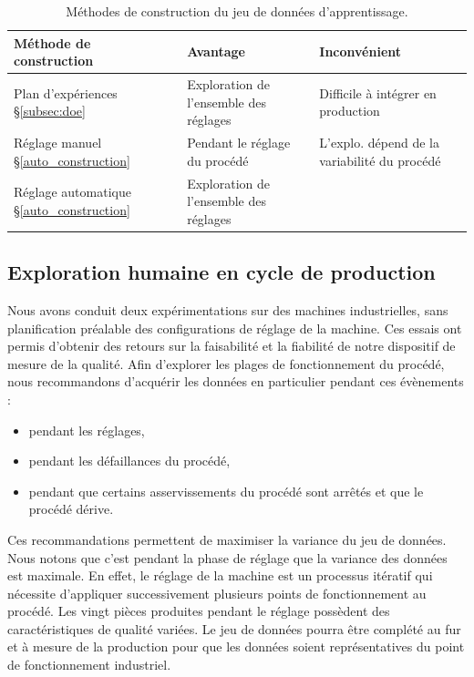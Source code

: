 \begin{table}[ht]
	\hspace*{-8mm}
	\begin{tabular}{|l|l|l|}
		\arrayrulecolor{black}
		\hline
		Méthode de construction & Avantage & Inconvénient \\ \hline
		\hline
		Plan d’expériences §\ref{subsec:doe} & Exploration de l'ensemble des réglages & Difficile à intégrer en production \\ \hline
		Réglage manuel §\ref{auto_construction} & Pendant le réglage du procédé & L’explo. dépend de la variabilité du procédé \\ \hline
		Réglage automatique §\ref{auto_construction} & Exploration de l'ensemble des réglages & \ \\ \hline
	\end{tabular}
	\caption{Méthodes de construction du jeu de données d'apprentissage.}
	\label{tab:dataset}
\end{table}

\subsection{Exploration humaine en cycle de production} \label{manual_construction}
Nous avons conduit deux expérimentations sur des machines industrielles, sans planification préalable des configurations de réglage de la machine.
Ces essais ont permis d'obtenir des retours sur la faisabilité et la fiabilité de notre dispositif de mesure de la qualité.
Afin d'explorer les plages de fonctionnement du procédé, nous recommandons d'acquérir les données en particulier pendant ces évènements :
\begin{itemize}
	\item pendant les réglages,
	\item pendant les défaillances du procédé,
	\item pendant que certains asservissements du procédé sont arrêtés et que le procédé dérive.
\end{itemize}
Ces recommandations permettent de maximiser la variance du jeu de données.
Nous notons que c'est pendant la phase de réglage que la variance des données est maximale.
En effet, le réglage de la machine est un processus itératif qui nécessite d'appliquer successivement plusieurs points de fonctionnement au procédé.
Les vingt pièces produites pendant le réglage possèdent des caractéristiques de qualité variées.
Le jeu de données pourra être complété au fur et à mesure de la production pour que les données soient représentatives du point de fonctionnement industriel.

